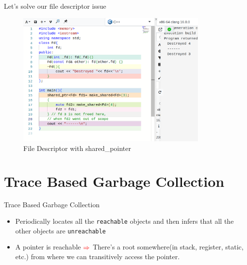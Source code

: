 \documentclass[
  10pt,
  ignorenonframetext,
]{beamer}
\providecommand{\tightlist}{%
  \setlength{\itemsep}{0pt}\setlength{\parskip}{0pt}}
\begin{document}
\begin{frame}{Let's solve our file descriptor
issue}
\protect\hypertarget{lets-solve-our-file-descriptor-issue}{}
\pause

\begin{figure}
\centering
\includegraphics[width=0.85\textwidth,height=\textheight]{images/fd_with_rc.png}
\caption{File Descriptor with shared\_pointer}
\end{figure}
\end{frame}

\hypertarget{trace-based-garbage-collection}{%
\section{Trace Based Garbage
Collection}\label{trace-based-garbage-collection}}

\begin{frame}{Trace Based Garbage Collection}
\pause

\begin{itemize}
\tightlist
\item
  Periodically locates all the \texttt{reachable}
  objects and then infers that all the other
  objects are \texttt{unreachable}
\end{itemize}

\pause

\begin{itemize}
\tightlist
\item
  A pointer is reachable
  \(\textcolor{red}{\Rightarrow }\) There's a root
  somewhere(in stack, register, static, etc.) from
  where we can transitively access the pointer.
\end{itemize}
\end{frame}
\end{document}
